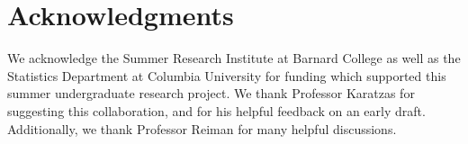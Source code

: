 \documentclass[12pt]{article}
\theoremstyle{plain}
\theoremstyle{definition}
\theoremstyle{remark}
\begin{document}
\section*{Acknowledgments}

We acknowledge the Summer Research Institute at Barnard College as well as the Statistics Department at Columbia University for funding which supported this summer undergraduate research project. We thank Professor Karatzas for suggesting this collaboration, and for his helpful feedback on an early draft. Additionally, we thank Professor Reiman for many helpful discussions.

\printbibliography
\end{document}
